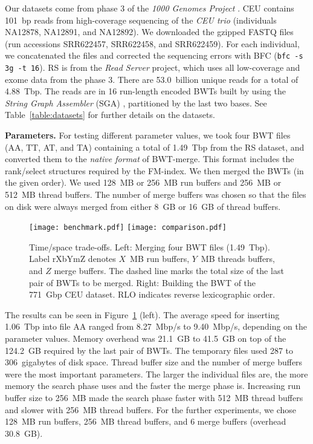 \documentclass[smallabstract,smallcaptions]{dccpaper}
\newcommand{\BWT}{\textsf{BWT}}
\newcommand{\rank}{\textsf{rank}}
\newcommand{\select}{\textsf{select}}
\newcommand{\BWTmerge}{\textsf{BWT\nobreakdash-merge}}
\newcommand{\CEU}{\textsf{CEU}}
\newcommand{\RS}{\textsf{RS}}
\begin{document}
Our datasets come from phase 3 of the \emph{1000 Genomes Project} \cite{1000GP2015}. \CEU{} contains 101~bp reads from high-coverage sequencing of the \emph{CEU trio} (individuals NA12878, NA12891, and NA12892). We downloaded the gzipped FASTQ files (run accessions SRR622457, SRR622458, and SRR622459). For each individual, we concatenated the files and corrected the sequencing errors with BFC \cite{Li2015} (\texttt{bfc -s 3g -t 16}). \RS{} is from the \emph{Read Server} project, which uses all low-coverage and exome data from the phase 3. There are 53.0~billion unique reads for a total of 4.88~Tbp. The reads are in 16 run-length encoded \BWT{}s built by using the \emph{String Graph Assembler} (SGA) \cite{Simpson2012}, partitioned by the last two bases. See Table~\ref{table:datasets} for further details on the datasets.

\smallbreak\noindent\textbf{Parameters.} For testing different parameter values, we took four \BWT{} files (AA, TT, AT, and TA) containing a total of 1.49~Tbp from the \RS{} dataset, and converted them to the \emph{native format} of \BWTmerge. This format includes the \rank/\select{} structures required by the FM-index. We then merged the \BWT{}s (in the given order). We used 128~MB or 256~MB run buffers and 256~MB or 512~MB thread buffers. The number of merge buffers was chosen so that the files on disk were always merged from either 8~GB or 16~GB of thread buffers.

\begin{figure}[t!]
\begin{center}
\texttt{[image: benchmark.pdf]}%
\hspace{-0.3in}%
\texttt{[image: comparison.pdf]}
\end{center}%
\vspace{-12pt}
\caption{Time/space trade-offs. Left: Merging four \BWT{} files (1.49~Tbp). Label rXbYmZ denotes $X$~MB run buffers, $Y$~MB threads buffers, and $Z$ merge buffers. The dashed line marks the total size of the last pair of \BWT{}s to be merged. Right: Building the \BWT{} of the 771~Gbp \CEU{} dataset. RLO indicates reverse lexicographic order.}\label{fig:benchmark}%
\vspace{-6pt}
\end{figure}

The results can be seen in Figure~\ref{fig:benchmark} (left). The average speed for inserting 1.06~Tbp into file AA ranged from 8.27~Mbp/s to 9.40~Mbp/s, depending on the parameter values. Memory overhead was 21.1~GB to 41.5~GB on top of the 124.2~GB required by the last pair of \BWT{}s.
The temporary files used 287 to 306~gigabytes of disk space. Thread buffer size and the number of merge buffers were the most important parameters. The larger the individual files are, the more memory the search phase uses and the faster the merge phase is. Increasing run buffer size to 256~MB made the search phase faster with 512~MB thread buffers and slower with 256~MB thread buffers.
For the further experiments, we chose 128~MB run buffers, 256~MB thread buffers, and 6 merge buffers (overhead 30.8~GB).
\end{document}
